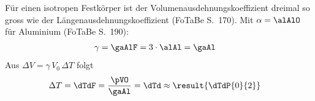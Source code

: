 Für einen isotropen Festkörper ist der Volumenausdehnungskoeffizient dreimal so gross wie der Längenausdehnungskoeffizient (FoTaBe S.~170). Mit $\alpha = \alAlO$ für Aluminium (FoTaBe S.~190):
\begin{align}
 \gamma &= \gaAlF = 3\cdot\alAl = \gaAl
\end{align}
Aus $\Delta V = \gamma\,V_0\,\Delta T$ folgt
\begin{align}
 \Delta T &= \dTdF = \frac{\pVO}{\gaAl} = \dTd \approx \result{\dTdP{0}{2}}
\end{align}

